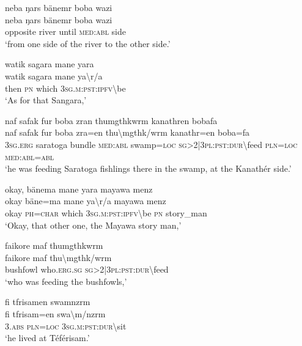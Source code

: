 \ea\label{ex:3:a7502}
neba ŋars bänemr boba wazi\\
\gll neba	ŋars	bänemr	boba	wazi\\
     opposite	river	until	\textsc{med}:\textsc{abl}	side\\
\glt `from one side of the river to the other side.'
\z

\ea\label{ex:3:a7505}
watik sagara mane yara\\
\gll watik	sagara	mane	ya{\textbackslash}r/a\\
     then	\textsc{pn}	which	3\textsc{sg}.\textsc{m}:\textsc{pst}:\textsc{ipfv}{\textbackslash}be\\
\glt `As for that Sangara,'
\z

\ea\label{ex:3:a7507}
naf safak fur boba zran thumgthkwrm kanathren bobafa\\
\gll naf	safak	fur	boba	zra=en	thu{\textbackslash}mgthk/wrm	kanathr=en	boba=fa\\
     3\textsc{sg}.\textsc{erg}	saratoga	bundle	\textsc{med}:\textsc{abl}	swamp=\textsc{loc}	\textsc{sg}>2|3\textsc{pl}:\textsc{pst}:\textsc{dur}{\textbackslash}feed	\textsc{pln}=\textsc{loc}	\textsc{med}:\textsc{abl}=\textsc{abl}\\
\glt `he was feeding Saratoga fishlings there in the swamp, at the Kanathér side.'
\z

\ea\label{ex:3:a7509}
okay, bänema mane yara mayawa menz\\
\gll okay	bäne=ma	mane	ya{\textbackslash}r/a	mayawa	menz\\
     okay	\textsc{ph}=\textsc{char}	which	3\textsc{sg}.\textsc{m}:\textsc{pst}:\textsc{ipfv}{\textbackslash}be	\textsc{pn}	story\_man\\
\glt `Okay, that other one, the Mayawa story man,'
\z

\ea\label{ex:3:a7511}
faikore maf thumgthkwrm\\
\gll faikore	maf	thu{\textbackslash}mgthk/wrm\\
     bushfowl	who.\textsc{erg}.\textsc{sg}	\textsc{sg}>2|3\textsc{pl}:\textsc{pst}:\textsc{dur}{\textbackslash}feed\\
\glt `who was feeding the bushfowls,'
\z

\ea\label{ex:3:a7512}
fi tfrisamen swamnzrm\\
\gll fi	tfrisam=en	swa{\textbackslash}m/nzrm\\
     3.\textsc{abs}	\textsc{pln}=\textsc{loc}	3\textsc{sg}.\textsc{m}:\textsc{pst}:\textsc{dur}{\textbackslash}sit\\
\glt `he lived at Téférisam.'
\z

